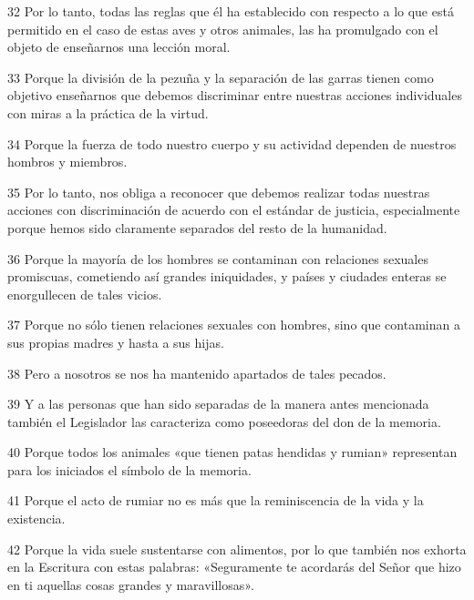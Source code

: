 \par 32 Por lo tanto, todas las reglas que él ha establecido con respecto a lo que está permitido en el caso de estas aves y otros animales, las ha promulgado con el objeto de enseñarnos una lección moral.

\par 33 Porque la división de la pezuña y la separación de las garras tienen como objetivo enseñarnos que debemos discriminar entre nuestras acciones individuales con miras a la práctica de la virtud.

\par 34 Porque la fuerza de todo nuestro cuerpo y su actividad dependen de nuestros hombros y miembros.

\par 35 Por lo tanto, nos obliga a reconocer que debemos realizar todas nuestras acciones con discriminación de acuerdo con el estándar de justicia, especialmente porque hemos sido claramente separados del resto de la humanidad.

\par 36 Porque la mayoría de los hombres se contaminan con relaciones sexuales promiscuas, cometiendo así grandes iniquidades, y países y ciudades enteras se enorgullecen de tales vicios.

\par 37 Porque no sólo tienen relaciones sexuales con hombres, sino que contaminan a sus propias madres y hasta a sus hijas.

\par 38 Pero a nosotros se nos ha mantenido apartados de tales pecados.

\par 39 Y a las personas que han sido separadas de la manera antes mencionada también el Legislador las caracteriza como poseedoras del don de la memoria.

\par 40 Porque todos los animales «que tienen patas hendidas y rumian» representan para los iniciados el símbolo de la memoria.

\par 41 Porque el acto de rumiar no es más que la reminiscencia de la vida y la existencia.

\par 42 Porque la vida suele sustentarse con alimentos, por lo que también nos exhorta en la Escritura con estas palabras: «Seguramente te acordarás del Señor que hizo en ti aquellas cosas grandes y maravillosas».

